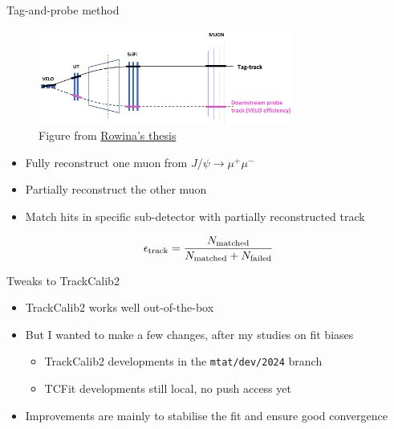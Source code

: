 \documentclass[xcolor={dvipsnames}]{beamer}
\begin{document}
\begin{frame}{Tag-and-probe method}
  \vspace{0.0cm}
  \begin{figure}[htb]
    \centering
    \includegraphics[width=0.75\textwidth]{Plots/Tag_and_probe_method.png}
    \caption*{\small Figure from \href{https://www.physi.uni-heidelberg.de/Publications/PhD_thesis.pdf}{Rowina's thesis}}
  \end{figure}
  \begin{itemize}
    \item{Fully reconstruct one muon from $J/\psi\to\mu^+\mu^-$}
    \item{Partially reconstruct the other muon}
    \item{Match hits in specific sub-detector with partially reconstructed track}
  \end{itemize}
  \begin{equation*}
    \epsilon_{\rm track} = \frac{N_{\rm matched}}{N_{\rm matched} + N_{\rm failed}}
  \end{equation*}
\end{frame}

\begin{frame}{Tweaks to TrackCalib2}
  \vspace{0.0cm}
  \begin{itemize}
    \setlength\itemsep{1.0em}
    \item{TrackCalib2 works well out-of-the-box}
    \item{But I wanted to make a few changes, after my studies on fit biases}
    \begin{itemize}
      \item{TrackCalib2 developments in the \texttt{mtat/dev/2024} branch}
      \item{TCFit developments still local, no push access yet}
    \end{itemize}
    \item{Improvements are mainly to stabilise the fit and ensure good convergence}
  \end{itemize}
\end{frame}
\end{document}
